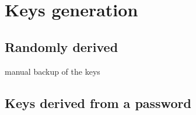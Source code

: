 %
%



\section{Keys generation}
\subsection{Randomly derived}
  manual backup of the keys
\subsection{Keys derived from a password}

